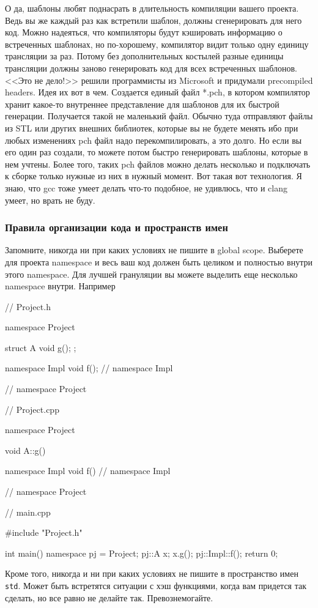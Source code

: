 О да, шаблоны любят поднасрать в длительность компиляции вашего проекта.
Ведь вы же каждый раз как встретили шаблон, должны сгенерировать для него код.
Можно надеяться, что компиляторы будут кэшировать информацию о встреченных шаблонах, но по-хорошему, компилятор видит только одну единицу трансляции за раз.
Потому без дополнительных костылей разные единицы трансляции должны заново генерировать код для всех встреченных шаблонов.
<<Это не дело!>> решили программисты из Microsoft и придумали precompiled headers.
Идея их вот в чем.
Создается единый файл *.pch, в котором компилятор хранит какое-то внутреннее представление для шаблонов для их быстрой генерации.
Получается такой не маленький файл.
Обычно туда отправляют файлы из STL или других внешних библиотек, которые вы не будете менять ибо при любых изменениях pch файл надо перекомпилировать, а это долго.
Но если вы его один раз создали, то можете потом быстро генерировать шаблоны, которые в нем учтены.
Более того, таких pch файлов можно делать несколько и подключать к сборке только нужные из них в нужный момент.
Вот такая вот технология.
Я знаю, что gcc тоже умеет делать что-то подобное, не удивлюсь, что и clang умеет, но врать не буду.


\subsubsection{Правила организации кода и пространств имен}

Запомните, никогда ни при каких условиях не пишите в global scope.
Выберете для проекта namespace и весь ваш код должен быть целиком и полностью внутри этого namespace.
Для лучшей грануляции вы можете выделить еще несколько namespace внутри.
Например
\begin{cppcode}
// Project.h

namespace Project {
struct A {
  void g();
};

namespace Impl {
void f();
} // namespace Impl
} // namespace Project

// Project.cpp

namespace Project {
void A::g() {}

namespace Impl {
void f() {}
} // namespace Impl
} // namespace Project

// main.cpp

#include "Project.h"

int main() {
  namespace pj = Project;
  pj::A x;
  x.g();
  pj::Impl::f();
  return 0;
}
\end{cppcode}
Кроме того, никогда и ни при каких условиях не пишите в пространство имен \verb"std".
Может быть встретятся ситуации с хэш функциями, когда вам придется так сделать, но все равно не делайте так.
Превознемогайте.

